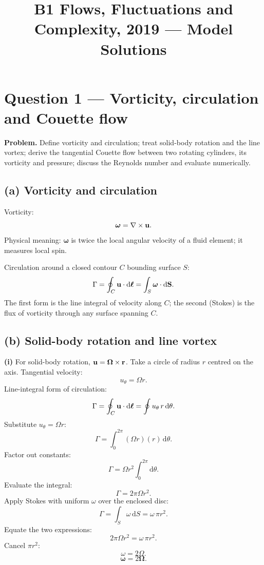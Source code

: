 \documentclass[11pt]{article}
\title{B1 Flows, Fluctuations and Complexity, 2019 --- Model Solutions}
\author{}
\date{}
\newcommand{\de}{\mathrm{d}}
\begin{document}
\maketitle

\section*{Question 1 --- Vorticity, circulation and Couette flow}

\textbf{Problem.} Define vorticity and circulation; treat solid-body rotation and the line vortex; derive the tangential Couette flow between two rotating cylinders, its vorticity and pressure; discuss the Reynolds number and evaluate numerically.

\subsection*{(a) Vorticity and circulation}

Vorticity:
\[ \bm\omega = \nabla\times\vb u. \]
Physical meaning: $\bm\omega$ is twice the local angular velocity of a fluid element; it measures local spin.

Circulation around a closed contour $C$ bounding surface $S$:
\[ \Gamma = \oint_C \vb u\cdot\de\bm\ell = \int_S \bm\omega\cdot\de\vb S. \]
The first form is the line integral of velocity along $C$; the second (Stokes) is the flux of vorticity through any surface spanning $C$.

\subsection*{(b) Solid-body rotation and line vortex}

\textbf{(i)} For solid-body rotation, $\vb u = \bm\Omega\times\vb r$. Take a circle of radius $r$ centred on the axis. Tangential velocity:
\[ u_\theta = \Omega r. \]
Line-integral form of circulation:
\[ \Gamma = \oint_C \vb u\cdot\de\bm\ell = \oint u_\theta\,r\,\de\theta. \]
Substitute $u_\theta = \Omega r$:
\[ \Gamma = \int_0^{2\pi}\!(\Omega r)(r)\,\de\theta. \]
Factor out constants:
\[ \Gamma = \Omega r^2\!\int_0^{2\pi}\!\de\theta. \]
Evaluate the integral:
\[ \Gamma = 2\pi\Omega r^2. \]
Apply Stokes with uniform $\omega$ over the enclosed disc:
\[ \Gamma = \int_S \omega\,\de S = \omega\,\pi r^2. \]
Equate the two expressions:
\[ 2\pi\Omega r^2 = \omega\,\pi r^2. \]
Cancel $\pi r^2$:
\[ \omega = 2\Omega. \]
\[ \boxed{\;\bm\omega = 2\bm\Omega.\;} \]
\end{document}
